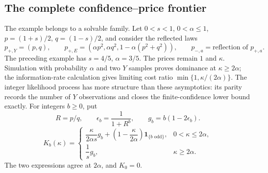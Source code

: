 \subsection{The complete confidence--price frontier}
\label{sec:exact-price-frontier}
The example belongs to a solvable family. Let $0<s<1$, $0<\alpha\leq1$,
$p=(1+s)/2$, $q=(1-s)/2$, and consider the reflected laws
\begin{equation}\label{eq:lattice-family}
 p_{+,Y}=(p,q),\qquad
 p_{+,E}=(\alpha p^2,\alpha q^2,1-\alpha(p^2+q^2)),
 \qquad p_{-,a}=\text{reflection of }p_{+,a}.
\end{equation}
The preceding example has $s=4/5$, $\alpha=3/5$.
The prices remain $1$ and $\kappa$. Simulation with probability $\alpha$
and two $Y$ samples proves dominance at $\kappa\geq2\alpha$; the
information-rate calculation gives limiting cost ratio
$\min\{1,\kappa/(2\alpha)\}$.
The integer likelihood process has more structure than these asymptotics:
its parity records the number of $Y$ observations and closes the
finite-confidence lower bound exactly.
For integers $b\geq0$, put
\begin{equation}\label{eq:barrier-points}
 R=p/q,\qquad \epsilon_b=\frac1{1+R^b},\qquad
 g_b=b(1-2\epsilon_b).
\end{equation}
\begin{equation}\label{eq:barrier-costs}
 K_b(\kappa)=
 \begin{cases}
 \dfrac{\kappa}{2\alpha s}g_b+
       \left(1-\dfrac{\kappa}{2\alpha}\right)\mathbf1_{\{b\text{ odd}\}},
       &0<\kappa\leq2\alpha,\\[3pt]
 \dfrac1s g_b,&\kappa\geq2\alpha.
 \end{cases}
\end{equation}
The two expressions agree at $2\alpha$, and $K_0=0$.

